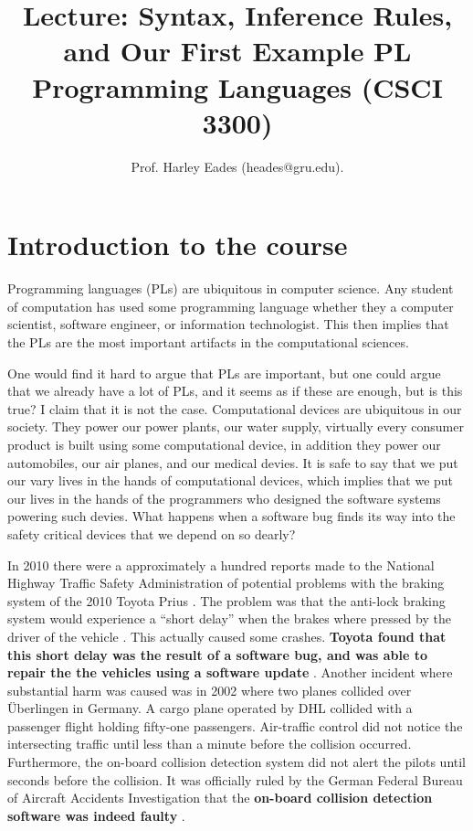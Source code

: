 \documentclass{article}
\title{Lecture: Syntax, Inference Rules, and Our First Example
  PL\\Programming Languages (CSCI 3300)\vspace{-22px}}
\author{Prof. Harley Eades (heades@gru.edu).}  \date{\vspace{-22px}}
\begin{document}
\maketitle  

\section{Introduction to the course}
\label{sec:introduction}
Programming languages (PLs) are ubiquitous in computer science.  Any
student of computation has used some programming language whether they
a computer scientist, software engineer, or information
technologist. This then implies that the PLs are the most important
artifacts in the computational sciences.

One would find it hard to argue that PLs are important, but one could
argue that we already have a lot of PLs, and it seems as if these are
enough, but is this true?  I claim that it is not the case.
Computational devices are ubiquitous in our society.  They power our
power plants, our water supply, virtually every consumer product is
built using some computational device, in addition they power our
automobiles, our air planes, and our medical devies.  It is safe to
say that we put our vary lives in the hands of computational devices,
which implies that we put our lives in the hands of the programmers
who designed the software systems powering such devies.  What happens
when a software bug finds its way into the safety critical devices
that we depend on so dearly?

In 2010 there were a approximately a hundred reports made to the
National Highway Traffic Safety Administration of potential problems
with the braking system of the 2010 Toyota Prius \cite{Consumer:2010}.
The problem was that the anti-lock braking system would experience a
``short delay'' when the brakes where pressed by the driver of the
vehicle \cite{thedetroitbureau.com:2009}.  This actually caused some
crashes.  \textbf{Toyota found that this short delay was the result of
  a software bug, and was able to repair the the vehicles using a
  software update} \cite{Reuters:2009}.  Another incident where
substantial harm was caused was in 2002 where two planes collided over
\"{U}berlingen in Germany. A cargo plane operated by DHL collided with
a passenger flight holding fifty-one passengers.  Air-traffic control
did not notice the intersecting traffic until less than a minute
before the collision occurred.  Furthermore, the on-board collision
detection system did not alert the pilots until seconds before the
collision.  It was officially ruled by the German Federal Bureau of
Aircraft Accidents Investigation that the \textbf{on-board collision
  detection software was indeed faulty} \cite{Collision:2004}.
\end{document}
